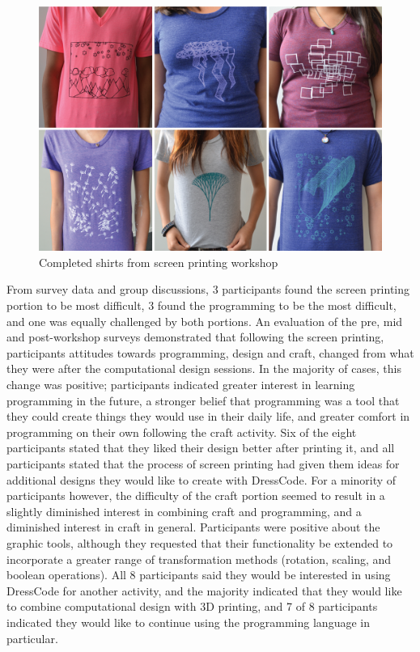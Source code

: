 \documentclass{sigchi}
\begin{document}
\begin{center}
\begin{figure}[h!]
\includegraphics[width=\columnwidth]{images/shirt_results.jpg}
\caption{Completed shirts from screen printing workshop}
\label{fig:screen_results}
\end{figure}
\end{center}
\vspace{-20pt}

From survey data and group discussions, 3 participants found the screen printing portion to be most difficult, 3 found the programming to be the most difficult, and one was equally challenged by both portions. An evaluation of the pre, mid and post-workshop surveys demonstrated that following the screen printing, participants attitudes towards programming, design and craft, changed from what they were after the computational design sessions. In the majority of cases, this change was positive; participants indicated greater interest in learning programming in the future, a stronger belief that programming was a tool that they could create things they would use in their daily life, and greater comfort in programming on their own following the craft activity. Six of the eight participants stated that they liked their design better after printing it, and all participants stated that the process of screen printing had given them ideas for additional designs they would like to create with DressCode. For a minority of participants however, the difficulty of the craft portion seemed to result in a slightly diminished interest in combining craft and programming, and a diminished interest in craft in general. Participants were positive about the graphic tools, although they requested that their functionality be extended to incorporate a greater range of transformation methods (rotation, scaling, and boolean operations). All 8 participants said they would be interested in using DressCode for another activity, and the majority indicated that they would like to combine computational design with 3D printing, and 7 of 8 participants indicated they would like to continue using the programming language in particular.
\end{document}
